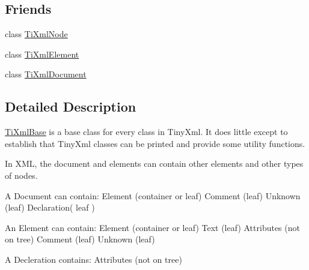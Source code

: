 \subsection*{Friends}
\begin{DoxyCompactItemize}
\item 
\hypertarget{class_ti_xml_base_a218872a0d985ae30e78c55adc4bdb196}{
class \hyperlink{class_ti_xml_base_a218872a0d985ae30e78c55adc4bdb196}{TiXmlNode}}
\label{class_ti_xml_base_a218872a0d985ae30e78c55adc4bdb196}

\item 
\hypertarget{class_ti_xml_base_ab6592e32cb9132be517cc12a70564c4b}{
class \hyperlink{class_ti_xml_base_ab6592e32cb9132be517cc12a70564c4b}{TiXmlElement}}
\label{class_ti_xml_base_ab6592e32cb9132be517cc12a70564c4b}

\item 
\hypertarget{class_ti_xml_base_a173617f6dfe902cf484ce5552b950475}{
class \hyperlink{class_ti_xml_base_a173617f6dfe902cf484ce5552b950475}{TiXmlDocument}}
\label{class_ti_xml_base_a173617f6dfe902cf484ce5552b950475}

\end{DoxyCompactItemize}


\subsection{Detailed Description}
\hyperlink{class_ti_xml_base}{TiXmlBase} is a base class for every class in TinyXml. It does little except to establish that TinyXml classes can be printed and provide some utility functions.

In XML, the document and elements can contain other elements and other types of nodes.

\begin{DoxyVerb}
	A Document can contain:	Element	(container or leaf)
							Comment (leaf)
							Unknown (leaf)
							Declaration( leaf )

	An Element can contain:	Element (container or leaf)
							Text	(leaf)
							Attributes (not on tree)
							Comment (leaf)
							Unknown (leaf)

	A Decleration contains: Attributes (not on tree)
	\end{DoxyVerb}
 

